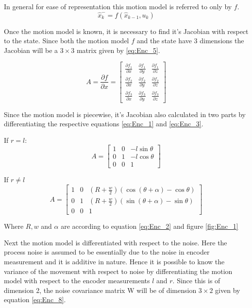 In general for ease of representation this motion model is referred to only by $ f $. 
\begin{equation}[h!]
\label{eq:Enc_4}
\hat{x}^-_k = f(\hat{x}_{k-1},u_k)
\end{equation}

Once the motion model is known, it is necessary to find it's Jacobian with respect to the state. Since both the motion model $ f $ and the state have 3 dimensions the Jacobian will be a $ 3\times 3 $ matrix given by \ref{eq:Enc_5}. 

\begin{equation}
\label{eq:Enc_5}
A = \frac{\partial f}{\partial x} = 
\begin{bmatrix}
\frac{\partial f_1}{\partial x} & \frac{\partial f_1}{\partial y} & \frac{\partial f_1}{\partial z} \\
\frac{\partial f_2}{\partial x} & \frac{\partial f_2}{\partial y} & \frac{\partial f_2}{\partial z} \\
\frac{\partial f_3}{\partial x} & \frac{\partial f_3}{\partial y} & \frac{\partial f_3}{\partial z}
\end{bmatrix}
\end{equation}

Since the motion model is piecewise, it's Jacobian also calculated in two parts by differentiating the respective equations \ref{eq:Enc_1} and \ref{eq:Enc_3}.

If $ r = l $:
\begin{equation}
\label{eq:Enc_6}
A = 
\begin{bmatrix}
1 & 0 & -l\sin\theta\\
0 & 1 & -l\cos\theta\\
0 & 0 & 1
\end{bmatrix}
\end{equation}

If $ r \neq l $
\begin{equation}
\label{eq:Enc_7}
A = 
\begin{bmatrix}
1 & 0 & (R+\frac{w}{2})(\cos(\theta+\alpha)-\cos\theta)\\
0 & 1 & (R+\frac{w}{2})(\sin(\theta+\alpha)-\sin\theta)\\
0 & 0 & 1
\end{bmatrix}
\end{equation}

Where $ R,w $ and $ \alpha $ are according to equation \ref{eq:Enc_2} and figure \ref{fig:Enc_1}

Next the motion model is differentiated with respect to the noise. Here the process noise is assumed to be essentially due to the noise in encoder measurement and it is additive in nature. Hence it is possible to know the variance of the movement with respect to noise by differentiating the motion model with respect to the encoder measurements $ l $ and $ r $. Since this is of dimension 2, the noise covariance matrix W will be of dimension $ 3\times 2 $ given by equation \ref{eq:Enc_8}.

